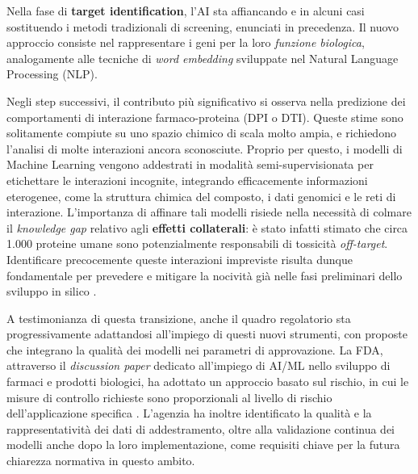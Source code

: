 Nella fase di \textbf{target identification}, l'AI sta affiancando 
e in alcuni casi sostituendo i metodi tradizionali di screening, enunciati in precedenza. 
Il nuovo approccio consiste nel rappresentare i geni per la loro \textit{funzione biologica}, analogamente alle 
tecniche di \textit{word embedding} sviluppate nel Natural Language Processing (NLP).

Negli step successivi, il contributo più significativo si osserva nella predizione dei comportamenti di interazione farmaco-proteina (DPI o DTI).
Queste stime sono solitamente compiute su uno spazio chimico di scala molto ampia, e richiedono l'analisi di molte interazioni ancora sconosciute. Proprio per questo, i modelli di Machine Learning vengono addestrati in modalità semi-supervisionata per etichettare le interazioni incognite, integrando efficacemente informazioni eterogenee, come la struttura chimica del composto, i dati genomici e le reti di interazione.
L'importanza di affinare tali modelli risiede nella necessità di colmare il \textit{knowledge gap} relativo agli \textbf{effetti collaterali}:
è stato infatti stimato che circa 1.000 proteine umane sono potenzialmente responsabili di tossicità \textit{off-target}. 
Identificare precocemente queste interazioni impreviste risulta dunque fondamentale per prevedere e mitigare la nocività già nelle fasi preliminari dello sviluppo in silico \cite{daraMachineLearningDrug2022}.

A testimonianza di questa transizione, anche il quadro regolatorio
sta progressivamente adattandosi all'impiego di questi nuovi strumenti, con proposte che integrano la qualità dei modelli nei parametri di approvazione.
La FDA, attraverso il \textit{discussion paper} dedicato
all'impiego di AI/ML nello sviluppo di farmaci e prodotti
biologici, ha adottato un approccio basato sul rischio, in cui le
misure di controllo richieste sono proporzionali al livello di
rischio dell'applicazione specifica
\cite{fdaAIMLDrugDev2025}. 
L'agenzia ha inoltre identificato la
qualità e la rappresentatività dei dati di addestramento, oltre
alla validazione continua dei modelli anche dopo la loro
implementazione, come requisiti chiave per la futura chiarezza
normativa in questo ambito.

